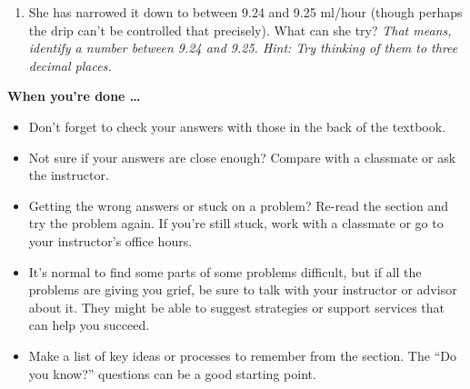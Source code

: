 \begin{enumerate}
\begin{enumerate}
\item She has narrowed it down to between 9.24 and 9.25 ml/hour (though perhaps the drip can't be controlled that precisely).  What can she try?   \emph{That means, identify a number between 9.24 and 9.25.  Hint:  Try thinking of them to three decimal places.}
\end{enumerate}

%
%

\end{enumerate}

\bigskip

\noindent \textbf{When you're done \ldots}

\begin{itemize}
\item Don't forget to check your answers with those in the back of the textbook. 
\item Not sure if your answers are close enough? Compare with a classmate or ask the instructor.  
\item Getting the wrong answers or stuck on a problem?  Re-read the section and try the problem again.   If you're still stuck, work with a classmate or go to your instructor's office hours.
\item It's normal to find some parts of some problems difficult, but if all the problems are giving you grief, be sure to talk with your instructor or advisor about it.  They might be able to suggest strategies or support services that can help you succeed.
\item Make a list of key ideas or processes to remember from the section.  The ``Do you know?'' questions can be a good starting point.
\end{itemize}



